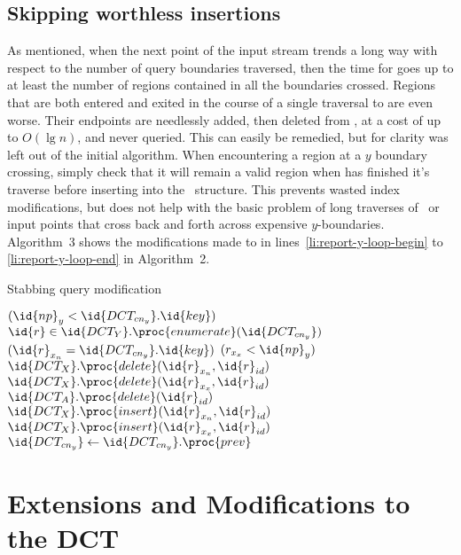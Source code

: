\documentclass{stdbm}
\newcommand{\meth}{.}
\newcommand{\inC}[1]{{\id{DCT_{#1}}}}
\newcommand{\X}{{\inC{X}}}
\newcommand{\Y}{{\inC{Y}}}
\newcommand{\A}{{\inC{A}}}
\newcommand{\cny}{{\inC{cn_y}}}
\begin{document}
\vspace*{-1ex}
\subsection{Skipping worthless insertions}
%
As mentioned, when the next point of the input stream trends a long
way with respect to the number of query boundaries traversed, then the
time for  goes up to at least the number of
regions contained in all the boundaries crossed.  Regions that are
both entered and exited in the course of a single traversal to
 are even worse.  Their endpoints are needlessly added, then
deleted from \X, at a cost of up to $O(\lg{n})$, and never queried.
This can easily be remedied, but for clarity was left out of the
initial  algorithm.  When encountering a region
at a $y$ boundary crossing, simply check that it will remain a valid
region when  has finished it's traverse before inserting into
the \X\ structure.  This prevents wasted index modifications, but
does not help with the basic problem of long traverses of \ or
input points that cross back and forth across expensive
$y$-boundaries.  Algorithm~3 shows the modifications made to
 in lines~\ref{li:report-y-loop-begin} to
\ref{li:report-y-loop-end} in Algorithm~2.

\begin{algorithm}[htbp]
\label{al:mod}
\caption{Stabbing query modification}
\begin{codebox}
\setcounter{codelinenumber}{\ref{li:report-y-loop-begin}}
\li \While $(\id{np}_y < \cny \meth \id{key})$
\li   \Do {} $\id{r} \in \Y \meth \proc{enumerate}(\cny)$
\li       \If $(\id{r}_{x_n} = \cny \meth \id{key})$
\li            \Then \If $(r_{x_x} < \id{np}_y)$
\li                 \Then $\X \meth \proc{delete}(\id{r}_{x_n},\id{r}_{id})$
\li                   $\X \meth \proc{delete}(\id{r}_{x_x},\id{r}_{id})$
\li               $\A \meth \proc{delete}(\id{r}_{id})$
\li                  \Else $\X \meth \proc{insert}(\id{r}_{x_n},\id{r}_{id})$
\li                   $\X \meth \proc{insert}(\id{r}_{x_x},\id{r}_{id})$
                  \End
       \End
\li     $\cny \gets \cny \meth \proc{prev}$
   \End
\end{codebox}
\end{algorithm}

\vspace*{-1ex}
\section{Extensions and Modifications to the DCT}
\label{sec:mods}
\end{document}
